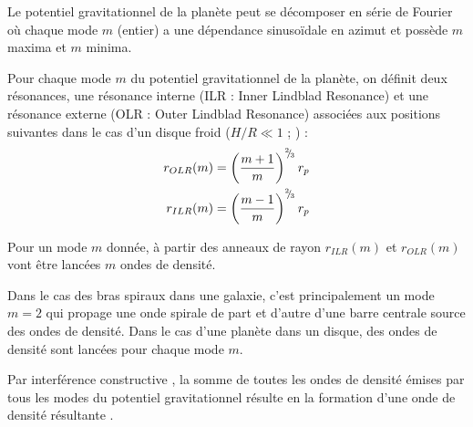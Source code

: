 

Le potentiel gravitationnel de la planète peut se décomposer en série de Fourier où chaque mode $m$ (entier) a une dépendance sinusoïdale en azimut et possède $m$ maxima et $m$ minima. 

Pour chaque mode $m$ du potentiel gravitationnel de la planète, on définit deux résonances, une résonance interne (ILR : Inner Lindblad Resonance) et une résonance externe (OLR : Outer Lindblad Resonance) associées aux positions suivantes dans le cas d'un disque froid ($H/R\ll 1$ ; \cite{ward1997protoplanet}) : 
\begin{subequations}
\begin{align}
r_{OLR}(m) &= \left(\frac{m+1}{m}\right)^{{}^{2\!\!}/ _{\!3}}r_p\\
r_{ILR}(m) &= \left(\frac{m-1}{m}\right)^{{}^{2\!\!}/ _{\!3}}r_p
\end{align}
\end{subequations}

Pour un mode $m$ donnée, à partir des anneaux de rayon $r_{ILR}(m)$ et $r_{OLR}(m)$ vont être lancées $m$ ondes de densité. 

Dans le cas des bras spiraux dans une galaxie, c'est principalement un mode $m=2$ qui propage une onde spirale de part et d'autre d'une barre centrale source des ondes de densité. Dans le cas d'une planète dans un disque, des ondes de densité sont lancées pour chaque mode $m$. 

Par interférence constructive \citep{ogilvie2002wake}, la somme de toutes les ondes de densité émises par tous les modes du
potentiel gravitationnel résulte en la formation d'une onde de densité résultante . 

